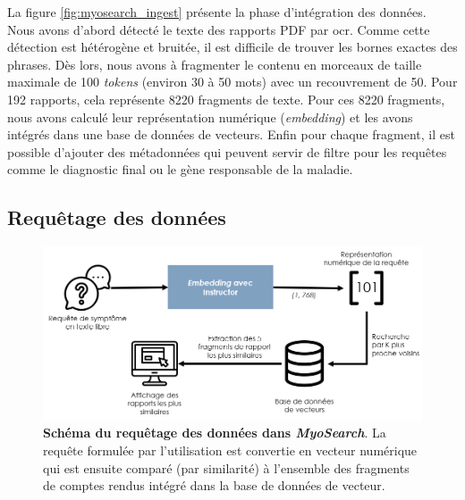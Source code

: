 La figure \ref{fig:myosearch_ingest} présente la phase d'intégration des données. Nous avons d'abord détecté le texte des rapports PDF par \gls{ocr}. Comme cette détection est hétérogène et bruitée, il est difficile de trouver les bornes exactes des phrases. Dès lors, nous avons à fragmenter le contenu en morceaux de taille maximale de 100 \textit{tokens} (environ 30 à 50 mots) avec un recouvrement de 50. Pour 192 rapports, cela représente 8220 fragments de texte. Pour ces 8220 fragments, nous avons calculé leur représentation numérique (\textit{embedding}) et les avons intégrés dans une base de données de vecteurs. Enfin pour chaque fragment, il est possible d'ajouter des métadonnées qui peuvent servir de filtre pour les requêtes comme le diagnostic final ou le gène responsable de la maladie.

\subsection{Requêtage des données}
\begin{figure}[!ht]
 \centering
 \includegraphics[width=1\textwidth]{figures/myosearch_query.png}
 \caption[Requêtage des données dans \textit{MyoSearch}]{\textbf{Schéma du requêtage des données dans \textit{MyoSearch}}. La requête formulée par l'utilisation est convertie en vecteur numérique qui est ensuite comparé (par similarité) à l'ensemble des fragments de comptes rendus intégré dans la base de données de vecteur.}
 \label{fig:myosearch_query}
\end{figure}
